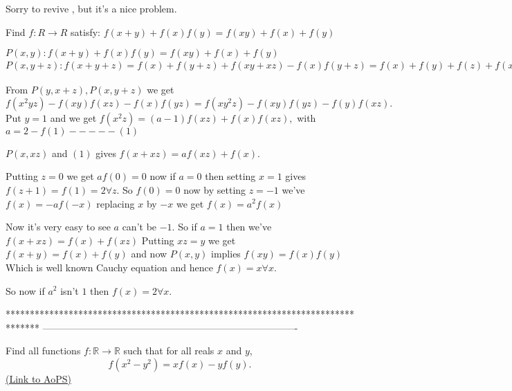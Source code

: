 


\begin{solution}
	Sorry to revive , but it's a nice problem.

\begin{tcolorbox}Find $f:R \to R$ satisfy:
$f(x+y)+f(x)f(y)=f(xy)+f(x)+f(y)$\end{tcolorbox}

$P(x,y): f(x+y)+f(x)f(y)=f(xy)+f(x)+f(y)$
$P(x,y+z): f(x+y+z)=f(x) + f(y + z) + f(xy + xz)-f(x)f(y + z)
=f(x) + f(y) + f(z) + f(xy) + f(yz) + f(zx) + f(x)f(y)f(z)-f(x)f(y)-f(y)f(z)-f(z)f(x)+f(x^2yz)-f(xy)f(xz)-f(x)f(yz).$

From $P(y,x+z),P(x,y+z)$ we get $f(x^2yz)-f(xy)f(xz)-f(x)f(yz) = f(xy^2z)-f(xy)f(yz)-f(y)f(xz).$
Put $y=1$ and we get $f(x^2z) = (a-1)f(xz) + f(x)f(xz),$ with $a=2-f(1)-----(1)$

$P(x,xz)$ and $(1)$ gives $f(x + xz) = af(xz) + f(x).$

Putting $z=0$ we get $af(0)=0$ now if $a=0$ then setting $x=1$ gives $f(z+1)=f(1)=2 \forall z$.
So $f(0)=0$ now by setting $z=-1$ we've $f(x)=-af(-x)$ replacing $x$ by $-x$ we get $f(x)=a^2f(x)$

Now it's very easy to see $a$ can't be $-1$. So if $a=1$ then we've $f(x+xz)=f(x)+f(xz)$
Putting $xz=y$ we get $f(x+y)=f(x)+f(y)$ and now $P(x,y)$ implies $f(xy)=f(x)f(y)$
Which is well known Cauchy equation and hence $f(x)=x \forall x$.

So now if $a^2$ isn't $1$ then $f(x)=2 \forall x$.
\end{solution}
*******************************************************************************
-------------------------------------------------------------------------------

\begin{problem}
	Find all functions $f: \mathbb R \to \mathbb R$ such that for all reals $x$ and $y$,
\[f(x^2-y^2)=xf(x)-yf(y).\]
	\flushright \href{https://artofproblemsolving.com/community/c6h385721}{(Link to AoPS)}
\end{problem}



